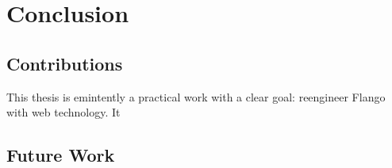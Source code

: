 \chapter{Conclusion}
\section{Contributions}
This thesis is emintently a practical work with a clear goal: reengineer Flango \cm with web technology.
It 

\section{Future Work}

